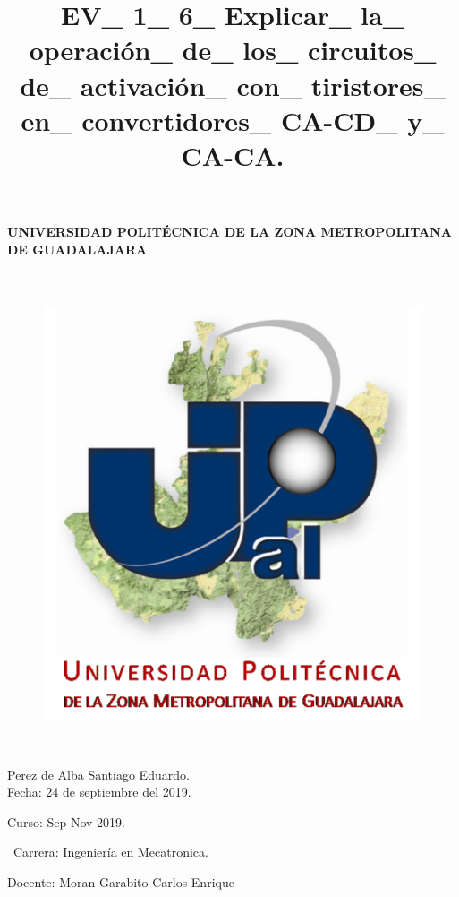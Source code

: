 \documentclass[12pt,letterpaper]{article}
\title{EV\_ 1\_ 6\_ Explicar\_ la\_ operación\_ de\_ los\_ circuitos\_ de\_ activación\_ con\_ tiristores\_ en\_ convertidores\_ CA-CD\_ y\_ CA-CA.}
\begin{document}
\maketitle




\paragraph{ UNIVERSIDAD POLITÉCNICA DE LA ZONA METROPOLITANA DE GUADALAJARA}

\
\begin{figure}[h!]
\begin{center}

\includegraphics[scale=0.8]{Upzmg.png} 
\label{Upzmg}


\end{center}
\end{figure}


\

\large{Perez de Alba Santiago Eduardo.\\
Fecha: 24 de septiembre del 2019.
\

Curso: Sep-Nov 2019.

\
Carrera: Ingeniería en Mecatronica.\

Docente: Moran Garabito Carlos Enrique}

\newpage
\end{document}
